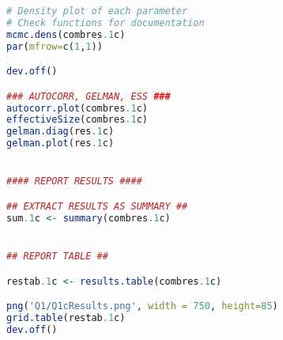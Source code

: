\documentclass[11pt]{article}
\begin{document}
\begin{lstlisting}[language=R]
# Density plot of each parameter
# Check functions for documentation
mcmc.dens(combres.1c)
par(mfrow=c(1,1))

dev.off()

### AUTOCORR, GELMAN, ESS ###
autocorr.plot(combres.1c)
effectiveSize(combres.1c)
gelman.diag(res.1c)
gelman.plot(res.1c)


#### REPORT RESULTS ####

## EXTRACT RESULTS AS SUMMARY ##
sum.1c <- summary(combres.1c)


## REPORT TABLE ##

restab.1c <- results.table(combres.1c)

png('Q1/Q1cResults.png', width = 750, height=85)
grid.table(restab.1c)
dev.off()

\end{lstlisting}

\newpage
\end{document}
